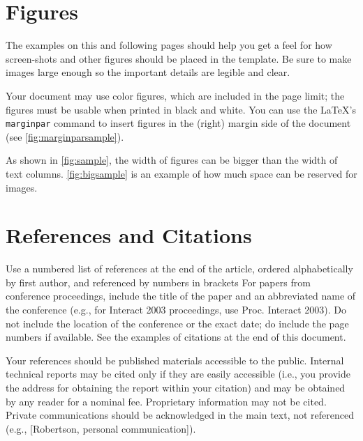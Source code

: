 \documentclass{chi-ext}
\begin{document}
\section{Figures}
The examples on this and following pages should help you get a feel for how screen-shots and other figures should be placed in the template. 
Be sure to make images large enough so the important details are legible and clear.

Your document may use color figures, which are included in the page limit; the figures must be usable when printed in black and white.
You can use the \LaTeX's \texttt{marginpar} command to insert figures in the (right) margin side of the document (see \autoref{fig:marginparsample}).

As shown in \autoref{fig:sample}, the width of figures can be bigger than the width of text columns.
\autoref{fig:bigsample} is an example of how much space can be reserved for images.


\section{References and Citations}
Use a numbered list of references at the end of the article, ordered alphabetically by first author, and referenced by numbers in brackets \cite{Anderson92,Klemmer02,Mather00,Zellweger01}
For papers from conference proceedings, include the title of the paper and an abbreviated name of the conference (e.g., for Interact 2003 proceedings, use Proc. Interact 2003). 
Do not include the location of the conference or the exact date; do include the page numbers if available. 
See the examples of citations at the end of this document. 

Your references should be published materials accessible to the public.  
Internal technical reports may be cited only if they are easily accessible (i.e., you provide the address for obtaining the report within your citation) and may be obtained by any reader for a nominal fee.  
Proprietary information may not be cited. 
Private communications should be acknowledged in the main text, not referenced  (e.g., [Robertson, personal communication]).
\end{document}
